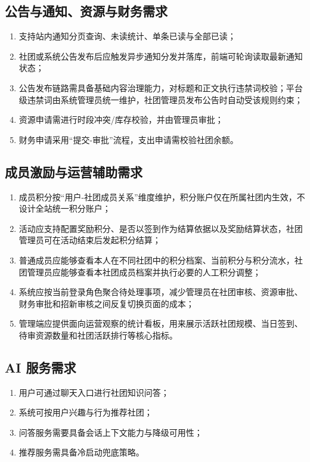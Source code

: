 \subsection{公告与通知、资源与财务需求}

\begin{enumerate}
  \item 支持站内通知分页查询、未读统计、单条已读与全部已读；
  \item 社团或系统公告发布后应触发异步通知分发并落库，前端可轮询读取最新通知状态；
  \item 公告发布链路需具备基础内容治理能力，对标题和正文执行违禁词校验；平台级违禁词由系统管理员统一维护，社团管理员发布公告时自动受该规则约束；
  \item 资源申请需进行时段冲突/库存校验，并由管理员审批；
  \item 财务申请采用“提交-审批”流程，支出申请需校验社团余额。
\end{enumerate}

\subsection{成员激励与运营辅助需求}

\begin{enumerate}
  \item 成员积分按“用户-社团成员关系”维度维护，积分账户仅在所属社团内生效，不设计全站统一积分账户；
  \item 活动应支持配置奖励积分、是否以签到作为结算依据以及奖励结算状态，社团管理员可在活动结束后发起积分结算；
  \item 普通成员应能够查看本人在不同社团中的积分档案、当前积分与积分流水，社团管理员应能够查看本社团成员档案并执行必要的人工积分调整；
  \item 系统应按当前登录角色聚合待处理事项，减少管理员在社团审核、资源审批、财务审批和招新审核之间反复切换页面的成本；
  \item 管理端应提供面向运营观察的统计看板，用来展示活跃社团规模、当日签到、待审资源数量和社团活跃排行等核心指标。
\end{enumerate}

\subsection{AI 服务需求}

\begin{enumerate}
  \item 用户可通过聊天入口进行社团知识问答；
  \item 系统可按用户兴趣与行为推荐社团；
  \item 问答服务需要具备会话上下文能力与降级可用性；
  \item 推荐服务需具备冷启动兜底策略。
\end{enumerate}

